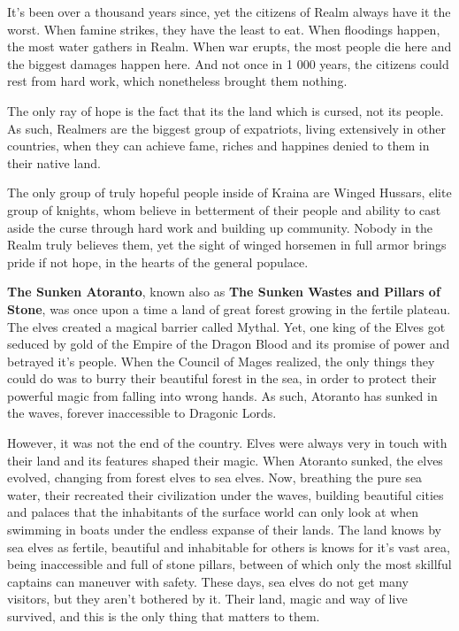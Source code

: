 \documentclass[a4paper,11pt]{article}
\begin{document}
It's been over a thousand years since, yet the citizens of Realm always have it the worst. When famine strikes, they have the least to eat. When floodings happen, the most water gathers in Realm. When war erupts, the most people die here and the biggest damages happen here. And not once in 1 000 years, the citizens could rest from hard work, which nonetheless brought them nothing. 

The only ray of hope is the fact that its the land which is cursed, not its people. As such, Realmers are the biggest group of expatriots, living extensively in other countries, when they can achieve fame, riches and happines denied to them in their native land.

The only group of truly hopeful people inside of Kraina are Winged Hussars, elite group of knights, whom believe in betterment of their people and ability to cast aside the curse through hard work and building up community. Nobody in the Realm truly believes them, yet the sight of winged horsemen in full armor brings pride if not hope, in the hearts of the general populace.  

\textbf{The Sunken Atoranto}, known also as \textbf{The Sunken Wastes and Pillars of Stone}, was once upon a time a land of great forest growing in the fertile plateau. The elves created a magical barrier called Mythal. Yet, one king of the Elves got seduced by gold of the Empire of the Dragon Blood and its promise of power and betrayed it's people. When the Council of Mages realized, the only things they could do was to burry their beautiful forest in the sea, in order to protect their powerful magic from falling into wrong hands. As such, Atoranto has sunked in the waves, forever inaccessible to Dragonic Lords. 

However, it was not the end of the country. Elves were always very in touch with their land and its features shaped their magic. When Atoranto sunked, the elves evolved, changing from forest elves to sea elves. Now, breathing the pure sea water, their recreated their civilization under the waves, building beautiful cities and palaces that the inhabitants of the surface world can only look at when swimming in boats under the endless expanse of their lands. The land knows by sea elves as fertile, beautiful and inhabitable for others is knows for it's vast area, being inaccessible and full of stone pillars, between of which only the most skillful captains can maneuver with safety. These days, sea elves do not get many visitors, but they aren't bothered by it. Their land, magic and way of live survived, and this is the only thing that matters to them.
\end{document}
